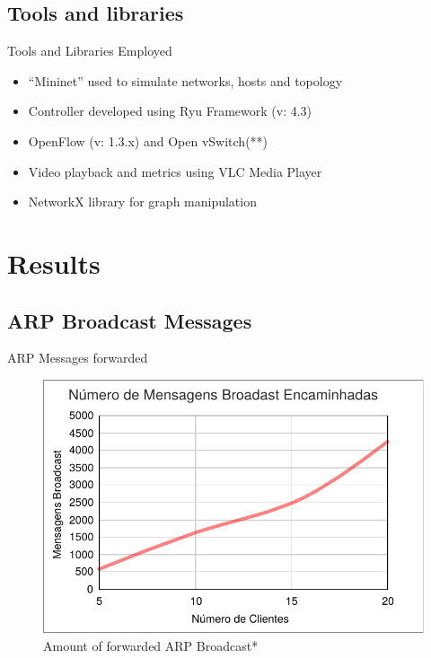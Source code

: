 \documentclass{beamer}
\begin{document}
\subsection{Tools and libraries}
\begin{frame}{Tools and Libraries Employed}
\begin{itemize}
  \item ``Mininet'' used to simulate networks, hosts and topology
  \item Controller developed using Ryu Framework (v: 4.3)
  \item OpenFlow (v: 1.3.x) and Open vSwitch(**)
  \item Video playback and metrics using VLC Media Player
  \item NetworkX library for graph manipulation
\end{itemize}
\end{frame}

\section{Results}


\subsection{ARP Broadcast Messages}
\begin{frame}{ARP Messages forwarded}
  \begin{figure}
    \includegraphics[scale=0.45]{images/graph_bcast.pdf}
    \caption{Amount of forwarded ARP Broadcast*}
  \end{figure}
\end{frame}
\end{document}
